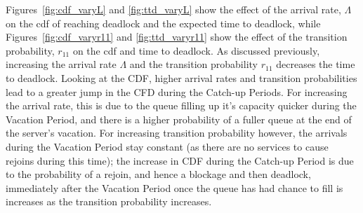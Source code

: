 \documentclass{article}
\begin{document}
Figures~\ref{fig:cdf_varyL} and \ref{fig:ttd_varyL} show the effect of the arrival rate, $\Lambda$ on the cdf of reaching deadlock and the expected time to deadlock, while Figures~\ref{fig:cdf_varyr11} and \ref{fig:ttd_varyr11} show the effect of the transition probability, $r_{11}$ on the cdf and time to deadlock.
As discussed previously, increasing the arrival rate $\Lambda$ and the transition probability $r_{11}$ decreases the time to deadlock.
Looking at the CDF, higher arrival rates and transition probabilities lead to a greater jump in the CFD during the Catch-up Periods.
For increasing the arrival rate, this is due to the queue filling up it's capacity quicker during the Vacation Period, and there is a higher probability of a fuller queue at the end of the server's vacation.
For increasing transition probability however, the arrivals during the Vacation Period stay constant (as there are no services to cause rejoins during this time); the increase in CDF during the Catch-up Period is due to the probability of a rejoin, and hence a blockage and then deadlock, immediately after the Vacation Period once the queue has had chance to fill is increases as the transition probability increases.
\end{document}

